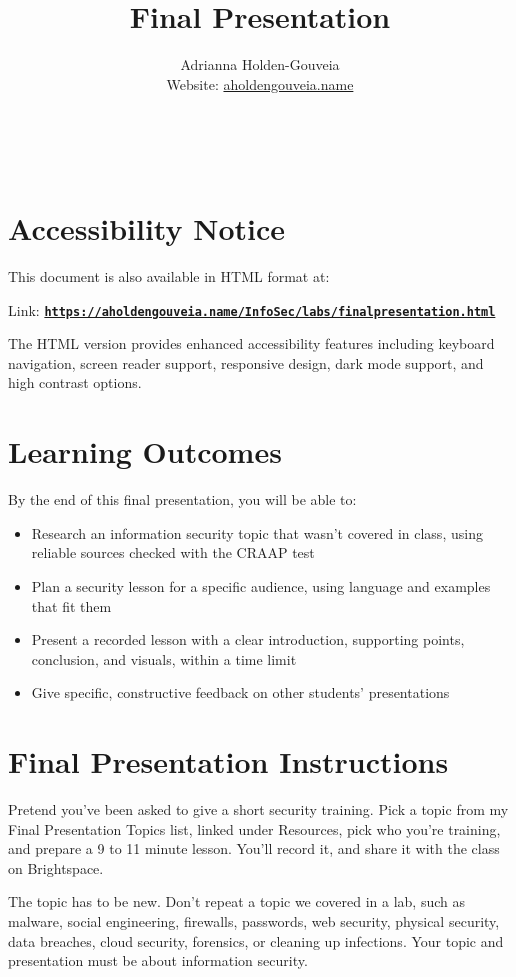 \documentclass[12pt]{article}
\title{Final Presentation}
\author{
        Adrianna Holden-Gouveia \\
        Website: \href{https://aholdengouveia.name}{aholdengouveia.name}\\ 
        \date{\vspace{-5ex}}
        \faGithub {: aholdengouveia} \\
        \faTwitter {: aholdengouveia} \\
        }
\begin{document}
\maketitle

\section*{Accessibility Notice}
This document is also available in HTML format at:

Link: \href{https://aholdengouveia.name/InfoSec/labs/finalpresentation.html}{\textbf{\nolinkurl{https://aholdengouveia.name/InfoSec/labs/finalpresentation.html}}}

The HTML version provides enhanced accessibility features including keyboard navigation, screen reader support, responsive design, dark mode support, and high contrast options.

\section*{Learning Outcomes}
By the end of this final presentation, you will be able to:
\begin{itemize}
    \item Research an information security topic that wasn't covered in class, using reliable sources checked with the CRAAP test
    \item Plan a security lesson for a specific audience, using language and examples that fit them
    \item Present a recorded lesson with a clear introduction, supporting points, conclusion, and visuals, within a time limit
    \item Give specific, constructive feedback on other students' presentations
\end{itemize}

\section*{Final Presentation Instructions}
Pretend you've been asked to give a short security training. Pick a topic from my Final Presentation Topics list, linked under Resources, pick who you're training, and prepare a 9 to 11 minute lesson. You'll record it, and share it with the class on Brightspace.

The topic has to be new. Don't repeat a topic we covered in a lab, such as malware, social engineering, firewalls, passwords, web security, physical security, data breaches, cloud security, forensics, or cleaning up infections. Your topic and presentation must be about information security.
\end{document}
